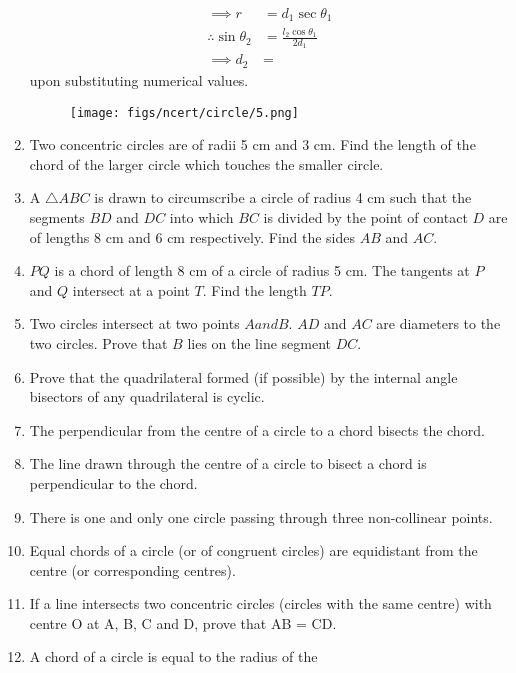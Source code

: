 \begin{enumerate}[label=\thesubsection.\arabic*,ref=\thesubsection.\theenumi]
\begin{align}
	\implies r &= d_1 \sec \theta_1  
	\\
	\therefore \sin\theta_2 &= \frac{l_2\cos \theta_1}{2d_1}	
	\\
	\implies d_2 &= 
\end{align}
upon substituting numerical values.
\begin{figure}[H]
	\begin{center}
		{\texttt{[image: figs/ncert/circle/5.png]}}
	\end{center}
	\caption{}
	\label{fig:ncert-circ-5}	
\end{figure}
%
\item  Two concentric circles are of radii 5 cm and 3 cm. Find the length of the chord of the larger circle which touches the smaller circle.
\item A $\triangle ABC$ is drawn to circumscribe a circle of radius 4 cm such that the segments $BD$ and $DC$ into which $BC$ is divided by the point of contact $D$ are of lengths 8 cm and 6 cm respectively. Find the sides $AB$ and $AC$.
\item $PQ$ is a chord of length 8 cm of a circle of radius 5 cm. The tangents at $P$ and $Q$ intersect at a point $T$. Find the length $TP$.
\item Two circles intersect at two points $A and B$. $AD$ and $AC$ are diameters to the two circles. Prove that $B$ lies on the line segment $DC$.
\item Prove that the quadrilateral formed (if possible) by the internal angle bisectors of any quadrilateral is cyclic.
\item  The perpendicular from the centre of a circle to a chord bisects the chord. 
\item  The line drawn through the centre of a circle to bisect a chord is perpendicular to the chord.
\item  There is one and only one circle passing through three non-collinear points. 
\item  Equal chords of a circle (or of congruent circles) are equidistant from the centre (or corresponding centres).
\item If a line intersects two concentric circles (circles with the same centre) with centre O at A, B, C and D, prove that AB = CD.
	\iffalse
\begin{enumerate}


\end{enumerate}
\fi
\item A chord of a circle is equal to the radius of the

\end{enumerate}
